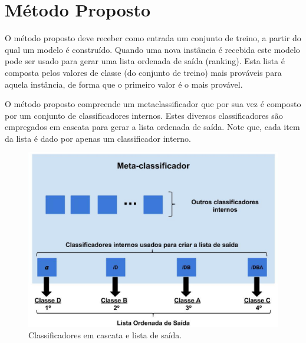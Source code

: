 \chapter{Método Proposto}
\label{chap:metodoproposto}

O método proposto deve receber como entrada um conjunto de treino, a partir do qual um modelo é construído. Quando uma nova instância é recebida este modelo pode ser usado para gerar uma lista ordenada de saída (ranking). Esta lista é composta pelos valores de classe (do conjunto de treino) mais prováveis para aquela instância, de forma que o primeiro valor é o mais provável. 

O método proposto compreende um metaclassificador que por sua vez é composto por um conjunto de classificadores internos. Estes diversos classificadores são empregados em cascata para gerar a lista ordenada de saída. Note que, cada item da lista é dado por apenas um classificador interno. 

\begin{figure}[h!]
  \includegraphics[width=\linewidth]{images/metodoproposto01v2.eps}
  \caption{Classificadores em cascata e lista de saída.}
  \label{fig:metodoproposto01}
\end{figure}

